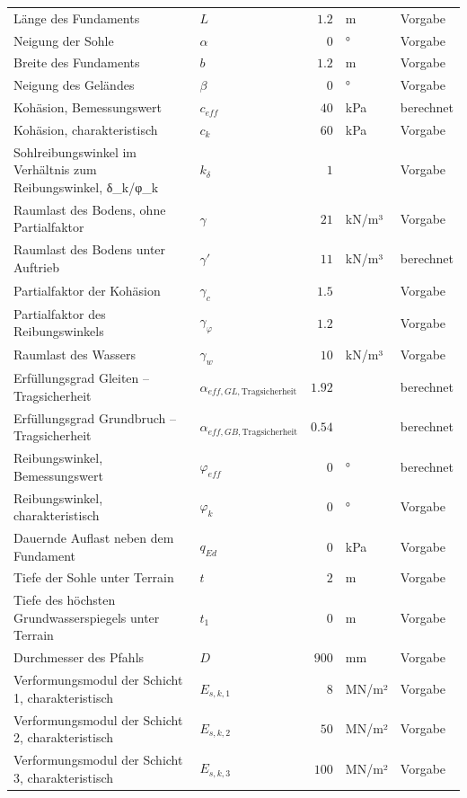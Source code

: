 \documentclass[11pt,a4paper]{article}
\begin{document}
\begin{xltabular}{\linewidth}{>{\raggedright\arraybackslash}Xlrll}
Länge des Fundaments & $L$ & $1.2$ & m & Vorgabe \\
Neigung der Sohle & $\alpha$ & $0$ & ° & Vorgabe \\
Breite des Fundaments & $b$ & $1.2$ & m & Vorgabe \\
Neigung des Geländes & $\beta$ & $0$ & ° & Vorgabe \\
Kohäsion, Bemessungswert & $c_{eff}$ & $40$ & kPa & berechnet \\
Kohäsion, charakteristisch & $c_k$ & $60$ & kPa & Vorgabe \\
Sohlreibungswinkel im Verhältnis zum Reibungswinkel, δ\_k/φ\_k & $k_{\delta}$ & $1$ &  & Vorgabe \\
Raumlast des Bodens, ohne Partialfaktor & $\gamma$ & $21$ & kN/m³ & Vorgabe \\
Raumlast des Bodens unter Auftrieb & $\gamma'$ & $11$ & kN/m³ & berechnet \\
Partialfaktor der Kohäsion & $\gamma_c$ & $1.5$ &  & Vorgabe \\
Partialfaktor des Reibungswinkels & $\gamma_{\varphi}$ & $1.2$ &  & Vorgabe \\
Raumlast des Wassers & $\gamma_w$ & $10$ & kN/m³ & Vorgabe \\
Erfüllungsgrad Gleiten – Tragsicherheit & $\alpha_{eff,GL,\text{Tragsicherheit}}$ & $1.92$ &  & berechnet \\
Erfüllungsgrad Grundbruch – Tragsicherheit & $\alpha_{eff,GB,\text{Tragsicherheit}}$ & $0.54$ &  & berechnet \\
Reibungswinkel, Bemessungswert & $\varphi_{eff}$ & $0$ & ° & berechnet \\
Reibungswinkel, charakteristisch & $\varphi_k$ & $0$ & ° & Vorgabe \\
Dauernde Auflast neben dem Fundament & $q_{Ed}$ & $0$ & kPa & Vorgabe \\
Tiefe der Sohle unter Terrain & $t$ & $2$ & m & Vorgabe \\
Tiefe des höchsten Grundwasserspiegels unter Terrain & $t_1$ & $0$ & m & Vorgabe \\
Durchmesser des Pfahls & $D$ & $900$ & mm & Vorgabe \\
Verformungsmodul der Schicht 1, charakteristisch & $E_{s,k,1}$ & $8$ & MN/m² & Vorgabe \\
Verformungsmodul der Schicht 2, charakteristisch & $E_{s,k,2}$ & $50$ & MN/m² & Vorgabe \\
Verformungsmodul der Schicht 3, charakteristisch & $E_{s,k,3}$ & $100$ & MN/m² & Vorgabe \\

\end{xltabular}
\end{document}
